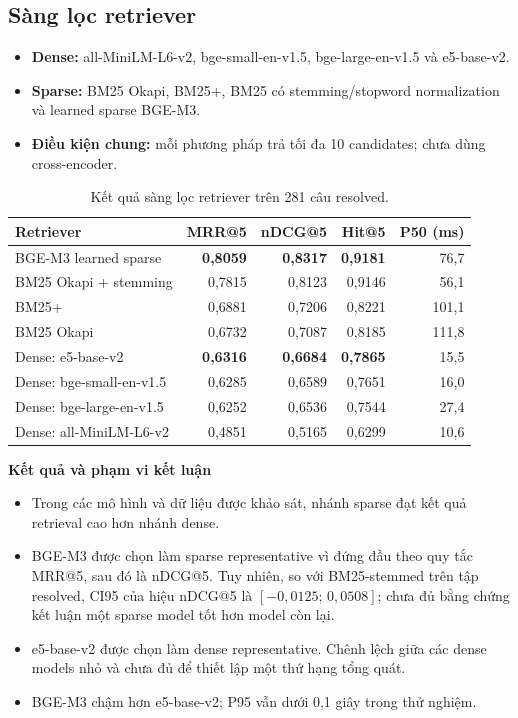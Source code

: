 \subsection{Sàng lọc retriever}

\begin{itemize}
  \item \textbf{Dense:} all-MiniLM-L6-v2, bge-small-en-v1.5,
  bge-large-en-v1.5 và e5-base-v2.
  \item \textbf{Sparse:} BM25 Okapi, BM25+, BM25 có
  stemming/stopword normalization và learned sparse BGE-M3.
  \item \textbf{Điều kiện chung:} mỗi phương pháp trả tối đa 10 candidates;
  chưa dùng cross-encoder.
\end{itemize}

\begin{table}[H]
  \centering
  \caption{Kết quả sàng lọc retriever trên 281 câu resolved.}
  \label{tab:phase1-retriever-screening}
  \small
  \begin{tabular}{lrrrr}
    \toprule
    \textbf{Retriever} & \textbf{MRR@5} & \textbf{nDCG@5} &
    \textbf{Hit@5} & \textbf{P50 (ms)} \\
    \midrule
    BGE-M3 learned sparse          & \textbf{0,8059} & \textbf{0,8317} & \textbf{0,9181} & 76,7 \\
    BM25 Okapi + stemming          & 0,7815 & 0,8123 & 0,9146 & 56,1 \\
    BM25+                          & 0,6881 & 0,7206 & 0,8221 & 101,1 \\
    BM25 Okapi                     & 0,6732 & 0,7087 & 0,8185 & 111,8 \\
    Dense: e5-base-v2              & \textbf{0,6316} & \textbf{0,6684} & \textbf{0,7865} & 15,5 \\
    Dense: bge-small-en-v1.5       & 0,6285 & 0,6589 & 0,7651 & 16,0 \\
    Dense: bge-large-en-v1.5       & 0,6252 & 0,6536 & 0,7544 & 27,4 \\
    Dense: all-MiniLM-L6-v2        & 0,4851 & 0,5165 & 0,6299 & 10,6 \\
    \bottomrule
  \end{tabular}
\end{table}

\noindent\textbf{Kết quả và phạm vi kết luận}
\begin{itemize}
  \item Trong các mô hình và dữ liệu được khảo sát, nhánh sparse đạt kết quả
  retrieval cao hơn nhánh dense.
  \item BGE-M3 được chọn làm sparse representative vì đứng đầu theo quy tắc
  MRR@5, sau đó là nDCG@5. Tuy nhiên, so với BM25-stemmed trên tập resolved,
  CI95 của hiệu nDCG@5 là $[-0,0125;\,0,0508]$; chưa đủ bằng chứng kết luận một
  sparse model tốt hơn model còn lại.
  \item e5-base-v2 được chọn làm dense representative. Chênh lệch giữa các
  dense models nhỏ và chưa đủ để thiết lập một thứ hạng tổng quát.
  \item BGE-M3 chậm hơn e5-base-v2; P95 vẫn dưới 0,1 giây trong thử nghiệm.
\end{itemize}

